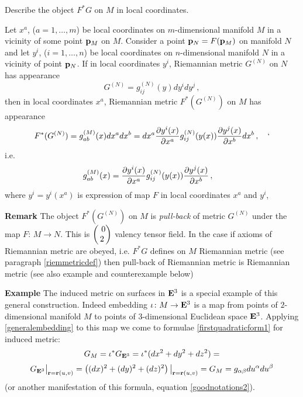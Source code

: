 \documentclass[12pt]{article}
\theoremstyle{theorem}
\numberwithin{equation}{section}
\begin{document}
 Describe the object $F^*G$ on $M$ in local coordinates.
  
Let  $x^a$, ($a=1,\dots,m$) be local coordinates on 
$m$-dimensional  manifold
$M$  in a vicinity of some point
${\bf p}_M$ on $M$. Consider a point ${\bf p}_N=F({\bf p}_M)$
on manifold $N$  and let $y^i$,
($i=1,\dots,n$)  
be local coordinates on $n$-dimensional manifold $N$
in a vicinity of point  ${\bf p}_N$.
If in local coordinates $y^i$,
 Riemannian metric $G^{(N)}$ on $N$ has appearance 
      $$G^{(N)}
       =g^{(N)}_{ij}(y)dy^idy^j\,,
       $$
then in local coordinates $x^a$,
Riemannian metric $F^*(G^{(N)})$ on $M$ has appearance 
           \begin{equation*}
            F^*(G^{(N)})=
g^{(M)}_{ab}(x)dx^adx^b=
     dx^a{\partial y^i(x)\over \partial x^a}
       g^{(N)}_{ij}(y(x)) 
     {\partial y^j(x)\over \partial x^b}dx^b\,,\quad`
          \end{equation*}
i.e.      \begin{equation}\label{generalembedding}
g^{(M)}_{ab}(x)=
     {\partial y^i(x)\over \partial x^a}
       g^{(N)}_{ij}(y(x)) 
     {\partial y^j(x)\over \partial x^b}\,,\quad
          \end{equation}
where $y^i=y^i(x^a)$ is expression of map $F$ in local 
coordinates  $x^a$ and $y^i$,       


{\footnotesize
{\bf Remark}  The object $F^*(G^{(N)})$ on $M$
is {\it pull-back} of metric $G^{(N)}$
under the map $F\colon\, M\to N$.
This is $\begin{pmatrix}\ 0 \cr 2\cr \end{pmatrix}$ valency
tensor field. In the case if axioms of Riemannian metric are obeyed,
i.e. $F^*G$ defines on $M$ Riemannian metric 
(see paragraph \ref{riemmetricdef}) 
then pull-back of Riemannian metric is Riemannian metric 
(see also example and counterexample below) 
}
\smallskip 
 
{\bf Example}  The induced metric
on surfaces in ${\bf E}^3$ is a special example of this
general construction. Indeed embedding
   $\iota\colon M\to {\bf E}^3$ is a map from points
of $2$-dimensional 
manifold $M$ to points of $3$-dimensional 
Euclidean space ${\bf E}^3$.  Applying
\eqref{generalembedding} to this map we come
to formulae  \eqref{firstquadraticform1}  
for induced metric: 
              $$
   G_M= \iota^*G_{{\bf E}^3}=\iota^*(dx^2+dy^2+dz^2)=
              $$
            \begin{equation*}
      G_{{\bf E}^3}\big\vert_{{\bf r}={\bf r}(u,v)}=\left((dx)^2+(dy)^2+(dz)^2\right)\big\vert_{{\bf r}={\bf r}(u,v)}=
        G_M=g_{\alpha\beta}du^\alpha du^\beta
                 \end{equation*}
(or another manifestation of this formula, equation
  \eqref{goodnotations2}).
\end{document}
